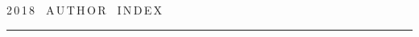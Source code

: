  \def\rightfootline{\small{СИСТЕМЫ И СРЕДСТВА ИНФОРМАТИКИ\ \ \ выпуск~28\ \ \


№~4\ \ \ 2018


 \hfill \textbf{\thepage}}}


 \label{end\stat}





\newpage





\def\stat{cont-e}


{%




\raggedleft\Large \bf%


2\,0\,1\,8\ \ A\,U\,T\,H\,O\,R\ \ I\,N\,D\,E\,X \vskip 17pt


 \hrule


 \par




 }





\label{st\stat}

















\def\leftkol{\ } %


\def\rightkol{\ } %




















\def\leftfootline{\small{\textbf{\thepage}


\hfill Sistemy i Sredstva Informatiki~---


Systems and Means of Informatics 2018 vol~28 no\,4}


}%


